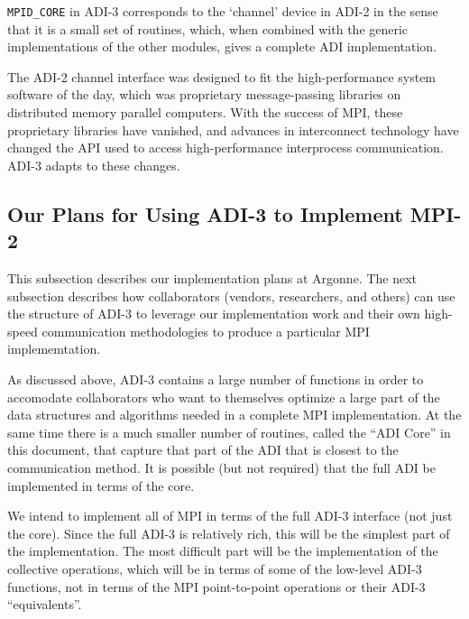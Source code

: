 \documentclass{article}
\begin{document}
\texttt{MPID_CORE} in ADI-3 corresponds to the `channel' device in ADI-2 in
the sense that it is a small set of routines, which, when combined with the
generic implementations of the other modules, gives a complete ADI
implementation.  

The ADI-2 channel interface was designed to fit the high-performance system
software of the day, which was proprietary message-passing libraries on
distributed memory parallel computers.  With the success of MPI, these
proprietary libraries have vanished, and advances in interconnect technology
have changed the API used to access high-performance interprocess
communication.  ADI-3 adapts to these changes.


\subsection{Our Plans for Using ADI-3 to Implement MPI-2}
\label{sec:plans}

%
%
This subsection describes our implementation plans at Argonne.  The next
subsection describes how collaborators (vendors, researchers, and others) can
use the structure of ADI-3 to leverage our implementation work and their own
high-speed communication methodologies to produce a particular MPI
implememtation.

As discussed above, ADI-3 contains a large number of functions in order to
accomodate collaborators who want to themselves optimize a large part of the
data structures and algorithms needed in a complete MPI implementation.  At the
same time there is a much smaller number of routines, called the ``ADI Core''
in this document, that capture that part of the ADI that is closest to the
communication method. It is possible (but not required) that the full ADI be
implemented in terms of the core.

We intend to implement all of MPI in terms of the full ADI-3 interface (not
just the core).  Since the full ADI-3 is relatively rich, this will be the
simplest part of the implementation.  The most difficult part will be the
implementation of the collective operations, which will be in terms of some of
the low-level ADI-3 functions, not in terms of the MPI point-to-point
operations or their ADI-3 ``equivalents''.
\end{document}
